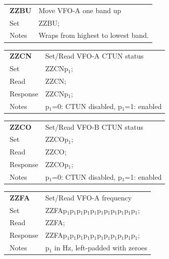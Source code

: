 \documentclass[12pt]{book}
\begin{document}
\begin{center}
\begin{tabular}{|p{2cm}|p{11cm}|}
\toprule
$\phantom{\Big|}$\textbf{\large ZZBU} & Move VFO-A one band up \\\cline{1-2}
$\phantom{\Big|}${\large Set} & {ZZBU;} \\\hline
$\phantom{\Big|}${\large Notes} & \multicolumn{1}{|p{11cm}|}{Wraps from highest to lowest band.} \\
\bottomrule
\end{tabular}
\end{center}

\begin{center}
\begin{tabular}{|p{2cm}|p{11cm}|}
\toprule
$\phantom{\Big|}$\textbf{\large ZZCN} & Set/Read VFO-A CTUN status \\\cline{1-2}
$\phantom{\Big|}${\large Set} & {ZZCNp$_1$;} \\\hline
$\phantom{\Big|}${\large Read} & {ZZCN;} \\\hline
$\phantom{\Big|}${\large Response} & {ZZCNp$_1$;} \\\hline
$\phantom{\Big|}${\large Notes} & \multicolumn{1}{|p{11cm}|}{p$_1$=0: CTUN disabled, p$_1$=1: enabled} \\
\bottomrule
\end{tabular}
\end{center}

\begin{center}
\begin{tabular}{|p{2cm}|p{11cm}|}
\toprule
$\phantom{\Big|}$\textbf{\large ZZCO} & Set/Read VFO-B CTUN status \\\cline{1-2}
$\phantom{\Big|}${\large Set} & {ZZCOp$_1$;} \\\hline
$\phantom{\Big|}${\large Read} & {ZZCO;} \\\hline
$\phantom{\Big|}${\large Response} & {ZZCOp$_1$;} \\\hline
$\phantom{\Big|}${\large Notes} & \multicolumn{1}{|p{11cm}|}{p$_1$=0: CTUN disabled, p$_1$=1: enabled} \\
\bottomrule
\end{tabular}
\end{center}

\begin{center}
\begin{tabular}{|p{2cm}|p{11cm}|}
\toprule
$\phantom{\Big|}$\textbf{\large ZZFA} & Set/Read VFO-A frequency \\\cline{1-2}
$\phantom{\Big|}${\large Set} & {ZZFAp$_1$p$_1$p$_1$p$_1$p$_1$p$_1$p$_1$p$_1$p$_1$p$_1$p$_1$;} \\\hline
$\phantom{\Big|}${\large Read} & {ZZFA;} \\\hline
$\phantom{\Big|}${\large Response} & {ZZFAp$_1$p$_1$p$_1$p$_1$p$_1$p$_1$p$_1$p$_1$p$_1$p$_1$p$_1$;} \\\hline
$\phantom{\Big|}${\large Notes} & \multicolumn{1}{|p{11cm}|}{p$_1$ in Hz, left-padded with zeroes} \\
\bottomrule
\end{tabular}
\end{center}
\end{document}
